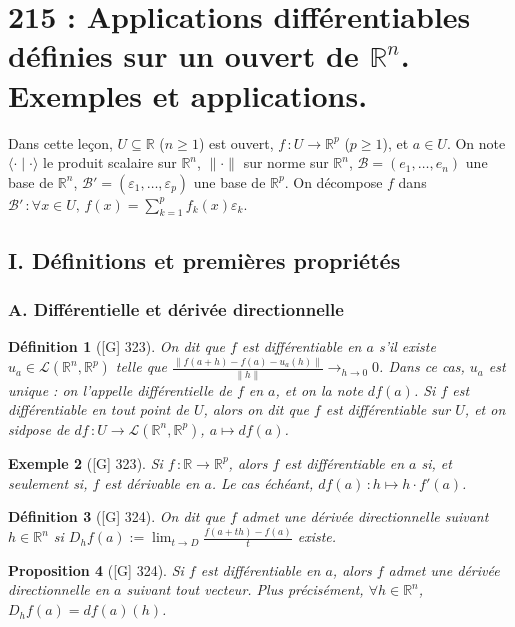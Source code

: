 \documentclass[10pt, a4paper, parskip=full, twoside, twocolumn]{report}
\newtheorem{definition}{Définition}
\newtheorem{proposition}[definition]{Proposition}
\newtheorem{example}[definition]{Exemple}
\newcommand{\IR}{\mathbb{R}}
\newcommand{\B}{\mathcal{B}}
\newcommand{\ps}[2]{\langle #1\mid #2\rangle}
\begin{document}
\chapter*{215 : Applications différentiables définies sur un ouvert de $\IR^n$. Exemples et applications.}
\setcounter{definition}{0}

\textcolor{paragraphtext}{Dans cette leçon, $U\subseteq \IR$ ($n\geq 1$) est ouvert, $f\,\colon U\to \IR^p$ ($p\geq 1$), et $a\in U$.
On note $\ps{\cdot}{\cdot}$ le produit scalaire sur $\IR^n$, $\|\cdot\|$ sur norme sur $\IR^n$, $\B=(e_1,\dots,e_n)$ une base de $\IR^n$, $\B'=(\varepsilon_1,\dots,\varepsilon_p)$ une base de $\IR^p$.
On décompose $f$ dans $\B'\,\colon \forall x\in U,\,f(x) = \sum_{k=1}^{p} f_k(x)\varepsilon_k$.}

\section*{I. Définitions et premières propriétés}
\subsection*{A. Différentielle et dérivée directionnelle}

\begin{definition}[\textnormal{[G] 323}]
	On dit que $f$ est \emph{différentiable en $a$} s'il existe $u_a\in\mathcal{L}(\IR^n,\IR^p)$ telle que $\frac{\|f(a+h)-f(a)-u_a(h)\|}{\|h\|}\longrightarrow_{h\to 0}0$.
	Dans ce cas, $u_a$ est unique : on l'appelle \emph{différentielle de $f$ en $a$}, et on la note $df(a)$.
	Si $f$ est différentiable en tout point de $U$, alors on dit que $f$ est \emph{différentiable sur $U$}, et on sidpose de $df\,\colon U\to \mathcal{L}(\IR^n,\IR^p)$, $a\mapsto df(a)$.
\end{definition}

\begin{example}[\textnormal{[G] 323}]
	Si $f\,\colon \IR\to\IR^p$, alors $f$ est différentiable en $a$ si, et seulement si, $f$ est dérivable en $a$.
	Le cas échéant, $df(a)\,\colon h\mapsto h\cdot f'(a)$.
\end{example}

\begin{definition}[\textnormal{[G] 324}]
	On dit que $f$ admet une \emph{dérivée directionnelle suivant $h\in\IR^n$} si $D_hf(a) := \lim_{t\to D} \frac{f(a+th) - f(a)}{t}$ existe.
\end{definition}

\begin{proposition}[\textnormal{[G] 324}]
	Si $f$ est différentiable en $a$, alors $f$ admet une dérivée directionnelle en $a$ suivant tout vecteur. Plus précisément, $\forall h\in \IR^n$, $D_hf(a)=df(a)(h)$.
\end{proposition}
\end{document}
